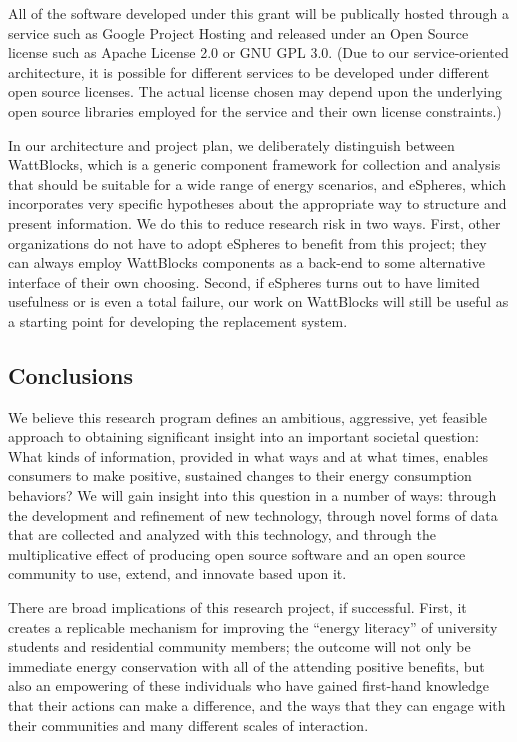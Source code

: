 All of the software developed under this grant will be publically hosted
through a service such as Google Project Hosting and released under an Open
Source license such as Apache License 2.0 or GNU GPL 3.0.  (Due to our
service-oriented architecture, it is possible for different services to be
developed under different open source licenses.  The actual license chosen
may depend upon the underlying open source libraries employed for the
service and their own license constraints.)

In our architecture and project plan, we deliberately distinguish between
WattBlocks, which is a generic component framework for collection and
analysis that should be suitable for a wide range of energy scenarios, and
eSpheres, which incorporates very specific hypotheses about the appropriate
way to structure and present information.  We do this to reduce research
risk in two ways. First, other organizations do not have to adopt eSpheres
to benefit from this project; they can always employ WattBlocks components
as a back-end to some alternative interface of their own choosing.  Second,
if eSpheres turns out to have limited usefulness or is even a total
failure, our work on WattBlocks will still be useful as a starting point
for developing the replacement system.

\subsection{Conclusions}
\label{sec:merit}

We believe this research program defines an ambitious, aggressive, yet
feasible approach to obtaining significant insight into an important
societal question: What kinds of information, provided in what ways and at
what times, enables consumers to make positive, sustained changes to their
energy consumption behaviors?  We will gain insight into this question in a
number of ways: through the development and refinement of new technology,
through novel forms of data that are collected and analyzed with this
technology, and through the multiplicative effect of producing open source
software and an open source community to use, extend, and innovate based
upon it.

There are broad implications of this research project, if successful.
First, it creates a replicable mechanism for improving the ``energy
literacy'' of university students and residential community members; the
outcome will not only be immediate energy conservation with all of the
attending positive benefits, but also an empowering of these individuals
who have gained first-hand knowledge that their actions can make a
difference, and the ways that they can engage with their communities and
many different scales of interaction.

